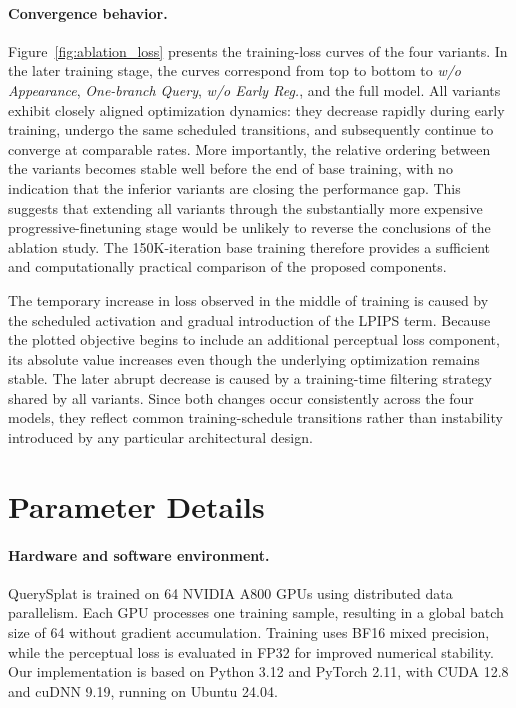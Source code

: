 \paragraph{Convergence behavior.}
Figure~\ref{fig:ablation_loss} presents the training-loss curves of the four variants. In the later training stage, the curves correspond from top to bottom to \emph{w/o Appearance}, \emph{One-branch Query}, \emph{w/o Early Reg.}, and the full model. All variants exhibit closely aligned optimization dynamics: they decrease rapidly during early training, undergo the same scheduled transitions, and subsequently continue to converge at comparable rates. More importantly, the relative ordering between the variants becomes stable well before the end of base training, with no indication that the inferior variants are closing the performance gap. This suggests that extending all variants through the substantially more expensive progressive-finetuning stage would be unlikely to reverse the conclusions of the ablation study. The 150K-iteration base training therefore provides a sufficient and computationally practical comparison of the proposed components.

The temporary increase in loss observed in the middle of training is caused by the scheduled activation and gradual introduction of the LPIPS term. Because the plotted objective begins to include an additional perceptual loss component, its absolute value increases even though the underlying optimization remains stable. The later abrupt decrease is caused by a training-time filtering strategy shared by all variants. Since both changes occur consistently across the four models, they reflect common training-schedule transitions rather than instability introduced by any particular architectural design.

















\section{Parameter Details}
\label{app:parameter_details}

\paragraph{Hardware and software environment.}
QuerySplat is trained on 64 NVIDIA A800 GPUs using distributed data parallelism. Each GPU processes one training sample, resulting in a global batch size of 64 without gradient accumulation. Training uses BF16 mixed precision, while the perceptual loss is evaluated in FP32 for improved numerical stability. Our implementation is based on Python 3.12 and PyTorch 2.11, with CUDA 12.8 and cuDNN 9.19, running on Ubuntu 24.04.

